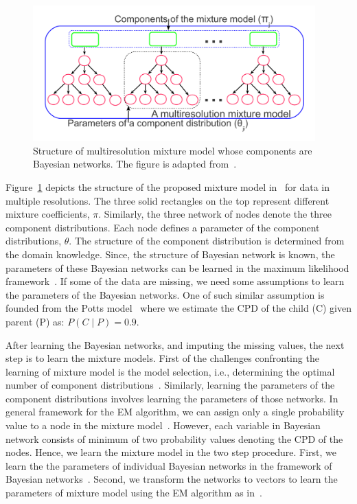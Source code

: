\begin{figure}[h!]
\centering
\includegraphics[trim=12mm 15mm 15mm 5mm,width=0.97\textwidth]{figures/multiresmix}
\caption[Multiresolution Mixture Model.]
{Structure of multiresolution mixture model whose components
are Bayesian networks. The figure is adapted from~.} 
\label{Fig:multiresmix}
\end{figure}

Figure~\ref{Fig:multiresmix} depicts the structure of the
proposed mixture model in~ for data in multiple 
resolutions. The three solid rectangles on the top represent 
different mixture coefficients, $\pi$. Similarly, the three
network of nodes denote the three component distributions.
Each node defines a parameter of the component distributions, 
$\theta$. The structure of the component  distribution is 
determined from the domain knowledge. Since, the structure 
of Bayesian network is known, the  parameters of these 
Bayesian networks can be learned  in the maximum likelihood 
framework~\cite{barberBRML12}. If some of the data are missing,
we need some assumptions to learn the parameters of the 
Bayesian networks. One of such similar assumption is founded 
from the Potts model~\cite{baxter08,potts52} where we
estimate the CPD of the child (C) given parent (P) as:
$P(C \mid P)=0.9$.

After learning the Bayesian networks,  and imputing the missing
values, the next step is to learn the mixture models. First of 
the challenges confronting the learning of mixture model is the
model selection, i.e., determining the optimal number of 
component distributions~\cite{fraley1998}. Similarly, learning 
the parameters of the component distributions involves learning 
the parameters of those networks. In general framework for 
the EM algorithm, we can assign only a single probability value 
to a node in the mixture model~\cite{expectmax}. However, each 
variable in Bayesian network consists of minimum of two 
probability values denoting the CPD of the nodes. Hence, we 
learn the mixture  model in the two step procedure. First, we 
learn the the parameters of individual Bayesian networks in 
the framework of Bayesian networks~\cite{barberBRML12,heckerman1999}.
Second, we transform the networks to vectors to learn the 
parameters of mixture  model using the EM  algorithm as 
in~\cite{tikka2007b}.


